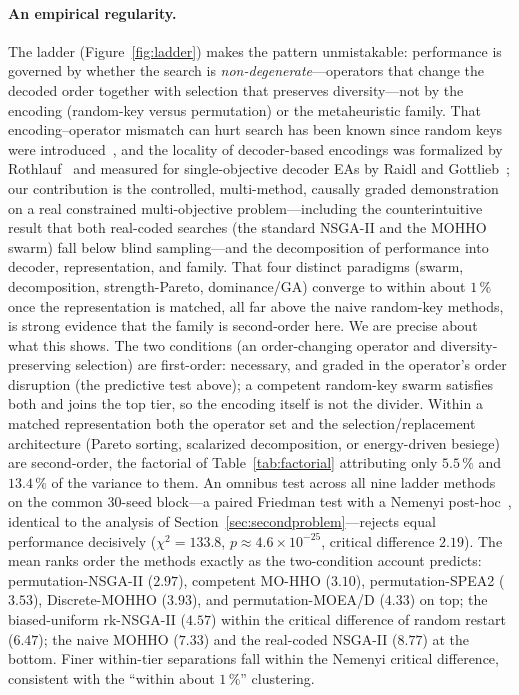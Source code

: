 \documentclass[runningheads]{llncs}
\begin{document}
\paragraph{An empirical regularity.}
The ladder (Figure~\ref{fig:ladder}) makes the pattern unmistakable: performance is governed by whether the search is \emph{non-degenerate}---operators that change the decoded order together with selection that preserves diversity---not by the encoding (random-key versus permutation) or the metaheuristic family. That encoding--operator mismatch can hurt search has been known since random keys were introduced~\cite{bean}, and the locality of decoder-based encodings was formalized by Rothlauf~\cite{rothlauf} and measured for single-objective decoder EAs by Raidl and Gottlieb~\cite{raidl}; our contribution is the controlled, multi-method, causally graded demonstration on a real constrained multi-objective problem---including the counterintuitive result that both real-coded searches (the standard NSGA-II and the MOHHO swarm) fall below blind sampling---and the decomposition of performance into decoder, representation, and family. That four distinct paradigms (swarm, decomposition, strength-Pareto, dominance/GA) converge to within about $1\,\%$ once the representation is matched, all far above the naive random-key methods, is strong evidence that the family is second-order here. We are precise about what this shows. The two conditions (an order-changing operator and diversity-preserving selection) are first-order: necessary, and graded in the operator's order disruption (the predictive test above); a competent random-key swarm satisfies both and joins the top tier, so the encoding itself is not the divider. Within a matched representation both the operator set and the selection/replacement architecture (Pareto sorting, scalarized decomposition, or energy-driven besiege) are second-order, the factorial of Table~\ref{tab:factorial} attributing only $5.5\,\%$ and $13.4\,\%$ of the variance to them. An omnibus test across all nine ladder methods on the common 30-seed block---a paired Friedman test with a Nemenyi post-hoc~\cite{demsar}, identical to the analysis of Section~\ref{sec:secondproblem}---rejects equal performance decisively ($\chi^2=133.8$, $p\approx4.6\times10^{-25}$, critical difference $2.19$). The mean ranks order the methods exactly as the two-condition account predicts: permutation-NSGA-II ($2.97$), competent MO-HHO ($3.10$), permutation-SPEA2 ($3.53$), Discrete-MOHHO ($3.93$), and permutation-MOEA/D ($4.33$) on top; the biased-uniform rk-NSGA-II ($4.57$) within the critical difference of random restart ($6.47$); the naive MOHHO ($7.33$) and the real-coded NSGA-II ($8.77$) at the bottom. Finer within-tier separations fall within the Nemenyi critical difference, consistent with the ``within about $1\,\%$'' clustering.
\end{document}
